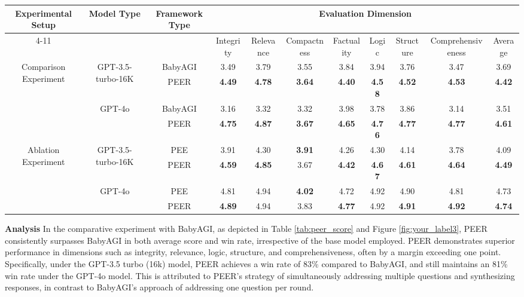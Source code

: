 \documentclass[11pt]{article}
\begin{document}
\begin{table*}[!h]
    \tiny
    \centering
    \renewcommand{\arraystretch}{1.5}
    \begin{tabular}{c|c|c|c|c|c|c|c|c|c|c}
    \hline
    \multirow{2}{*}{\centering Experimental Setup} &\multirow{2}{*}{\centering Model Type} &\multirow{2}{*}{Framework Type} &\multicolumn{8}{c}{Evaluation Dimension} \\
    \cline{4-11} 
     & & & Integrity & Relevance & Compactness & Factuality & Logic & Structure & Comprehensiveness & Average\\
    \hline
    \multirow{4}{*}{\centering Comparison Experiment}&\multirow{2}{*}{\centering GPT-3.5-turbo-16K}& BabyAGI & 3.49 & 3.79 & 3.55 & 3.84 & 3.94 & 3.76 & 3.47 & 3.69 \\
    \cline{3-11}
    & & PEER & \textbf{4.49} & \textbf{4.78} & \textbf{3.64} & \textbf{4.40} & \textbf{4.58} & \textbf{4.52} & \textbf{4.53} & \textbf{4.42} \\
    \cline{2-11}
    & \multirow{2}{*}{\centering GPT-4o}& BabyAGI & 3.16 & 3.32 & 3.32 & 3.98 & 3.78 & 3.86 & 3.14 & 3.51 \\
    \cline{3-11}
    & & PEER & \textbf{4.75} & \textbf{4.87} & \textbf{3.67} & \textbf{4.65} & \textbf{4.76} & \textbf{4.77} & \textbf{4.77} & \textbf{4.61} \\
    \hline
    \hline
    \multirow{4}{*}{\centering Ablation Experiment}&\multirow{2}{*}{\centering GPT-3.5-turbo-16K}& PEE & 3.91 & 4.30 & \textbf{3.91} & 4.26 & 4.30 & 4.14 & 3.78 & 4.09 \\
    \cline{3-11}
    & & PEER & \textbf{4.59} & \textbf{4.85} & 3.67 & \textbf{4.42} & \textbf{4.67} & \textbf{4.61} & \textbf{4.64} & \textbf{4.49} \\
    \cline{2-11}
    & \multirow{2}{*}{\centering GPT-4o}& PEE & 4.81 & 4.94 & \textbf{4.02} & 4.72 & 4.92 & 4.90 & 4.81 & 4.73 \\
    \cline{3-11}
    & & PEER & \textbf{4.89} & 4.94 & 3.83 & \textbf{4.77} & 4.92 & \textbf{4.91} & \textbf{4.92} & \textbf{4.74} \\
    \hline
    \end{tabular}
    \caption{Scoring results of PEER framework}
    \label{tab:peer_score}
\end{table*}

\textbf{Analysis} In the comparative experiment with BabyAGI, as depicted in Table \ref{tab:peer_score} and Figure \ref{fig:your_label3}, PEER consistently surpasses BabyAGI in both average score and win rate, irrespective of the base model employed. PEER demonstrates superior performance in dimensions such as integrity, relevance, logic, structure, and comprehensiveness, often by a margin exceeding one point. Specifically, under the GPT-3.5 turbo (16k) model, PEER achieves a win rate of 83\% compared to BabyAGI, and still maintains an 81\% win rate under the GPT-4o model. This is attributed to PEER’s strategy of simultaneously addressing multiple questions and synthesizing responses, in contrast to BabyAGI’s approach of addressing one question per round.
\end{document}
